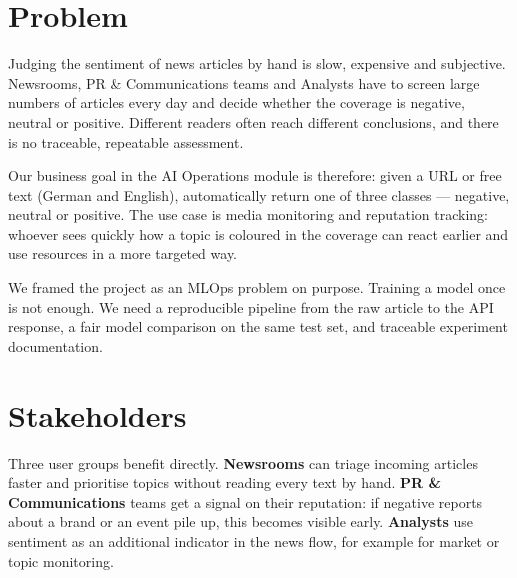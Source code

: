 \documentclass[12pt,toc=bib,toc=listof]{scrreprt}
\begin{document}


\renewcommand{\thesection}{\arabic{section}}

\section{Problem}

Judging the sentiment of news articles by hand is slow, expensive and subjective. Newsrooms, PR \& Communications teams and Analysts have to screen large numbers of articles every day and decide whether the coverage is negative, neutral or positive. Different readers often reach different conclusions, and there is no traceable, repeatable assessment.

Our business goal in the AI Operations module is therefore: given a URL or free text (German and English), automatically return one of three classes --- negative, neutral or positive. The use case is media monitoring and reputation tracking: whoever sees quickly how a topic is coloured in the coverage can react earlier and use resources in a more targeted way.

We framed the project as an MLOps problem on purpose. Training a model once is not enough. We need a reproducible pipeline from the raw article to the API response, a fair model comparison on the same test set, and traceable experiment documentation.

\section{Stakeholders}

Three user groups benefit directly. \textbf{Newsrooms} can triage incoming articles faster and prioritise topics without reading every text by hand. \textbf{PR \& Communications} teams get a signal on their reputation: if negative reports about a brand or an event pile up, this becomes visible early. \textbf{Analysts} use sentiment as an additional indicator in the news flow, for example for market or topic monitoring.
\end{document}
